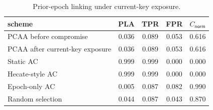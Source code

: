 \begin{table}[htbp]
\centering
\caption{Prior-epoch linking under current-key exposure.}
\label{tab:unlinkability-current-key}
\begin{tabular}{@{}lcccc@{}}
\toprule
scheme & PLA & TPR & FPR & $C_{\mathsf{norm}}$ \\
\midrule
PCAA before compromise & 0.036 & 0.089 & 0.053 & 0.616 \\
PCAA after current-key exposure & 0.036 & 0.089 & 0.053 & 0.616 \\
Static AC & 0.999 & 0.999 & 0.000 & 0.000 \\
Hecate-style AC & 0.999 & 0.999 & 0.000 & 0.000 \\
Epoch-only AC & 0.005 & 0.087 & 0.082 & 0.990 \\
Random selection & 0.044 & 0.087 & 0.043 & 0.870 \\
\bottomrule
\end{tabular}
\end{table}
